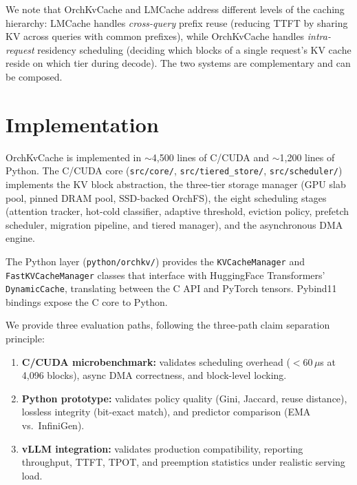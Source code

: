 \documentclass[acmsmall,nonacm,screen]{acmart}
\newcommand{\sys}{OrchKvCache}
\begin{document}
We note that \sys{} and LMCache address different levels of the caching
hierarchy: LMCache handles \emph{cross-query} prefix reuse (reducing TTFT
by sharing KV across queries with common prefixes), while \sys{} handles
\emph{intra-request} residency scheduling (deciding which blocks of a single
request's KV cache reside on which tier during decode).  The two systems
are complementary and can be composed.


\section{Implementation}\label{sec:impl}

\sys{} is implemented in ${\sim}$4{,}500 lines of C/CUDA and
${\sim}$1{,}200 lines of Python.  The C/CUDA core
(\texttt{src/core/}, \texttt{src/tiered\_store/}, \texttt{src/scheduler/})
implements the KV block abstraction, the three-tier storage manager
(GPU slab pool, pinned DRAM pool, SSD-backed OrchFS), the eight scheduling
stages (attention tracker, hot-cold classifier, adaptive threshold, eviction
policy, prefetch scheduler, migration pipeline, and tiered manager), and the
asynchronous DMA engine.

The Python layer (\texttt{python/orchkv/}) provides the
\texttt{KVCacheManager} and \texttt{FastKVCacheManager} classes that
interface with HuggingFace Transformers' \texttt{DynamicCache}, translating
between the C API and PyTorch tensors.  Pybind11 bindings expose the C core
to Python.

We provide three evaluation paths, following the three-path claim separation
principle:

\begin{enumerate}
  \item \textbf{C/CUDA microbenchmark:} validates scheduling overhead
    ($<$60\,$\mu$s at 4{,}096 blocks), async DMA correctness, and
    block-level locking.

  \item \textbf{Python prototype:} validates policy quality (Gini, Jaccard,
    reuse distance), lossless integrity (bit-exact match), and predictor
    comparison (EMA vs.\ InfiniGen).

  \item \textbf{vLLM integration:} validates production compatibility,
    reporting throughput, TTFT, TPOT, and preemption statistics under
    realistic serving load.
\end{enumerate}
\end{document}
